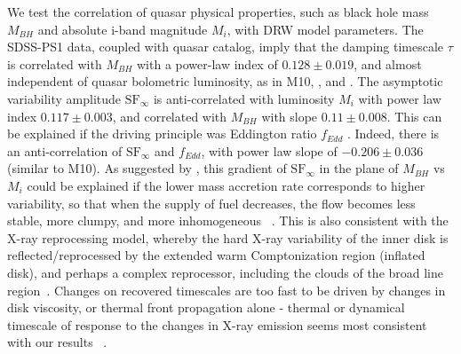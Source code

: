 \documentclass[twocolumn]{aastex62}
\begin{document}
We test the correlation of quasar physical properties, such as black hole mass $M_{BH}$ and absolute i-band magnitude $M_{i}$,  with DRW model parameters. The SDSS-PS1 data, coupled with \citet{shen2011} quasar catalog, imply that the damping timescale $\tau$  is correlated with $M_{BH}$ with a power-law index of $0.128 \pm 0.019$, and almost independent of quasar bolometric luminosity, as in M10, \citet{wilhite2008}, and \citet{vandenberk2004}. The asymptotic variability amplitude $\mathrm{SF}_{\infty}$ is anti-correlated with luminosity $M_{i}$ with power law index $0.117\pm0.003$, and correlated with $M_{BH}$ with slope $0.11\pm 0.008$. This can be explained if the driving principle was Eddington ratio $f_{Edd}$ \citep{wilhite2008}. Indeed, there is an anti-correlation of $\mathrm{SF}_{\infty}$ and $f_{Edd}$, with power law slope of $-0.206 \pm 0.036$ (similar to M10).  As suggested by \citet{kubota2018}, this gradient of $\mathrm{SF}_{\infty}$ in the plane of $M_{BH}$ vs $M_{i}$ could be explained if the lower mass accretion rate corresponds to higher variability, so that when the supply of fuel decreases, the flow becomes less stable, more clumpy, and more inhomogeneous ~\citep{rakshit2017, kokubo2015, dexter2011}.  This is also consistent with the X-ray reprocessing model, whereby the hard X-ray variability of the inner disk is reflected/reprocessed by the extended warm Comptonization region (inflated disk), and perhaps a complex reprocessor, including the clouds of the broad line region~\citep{kubota2018, panda2019b}. Changes on recovered timescales are too fast to be driven by changes in disk viscosity, or thermal front propagation alone - thermal or dynamical timescale of response to the changes in X-ray emission seems most consistent with our results ~\citep{stern2018}.



\end{document}
